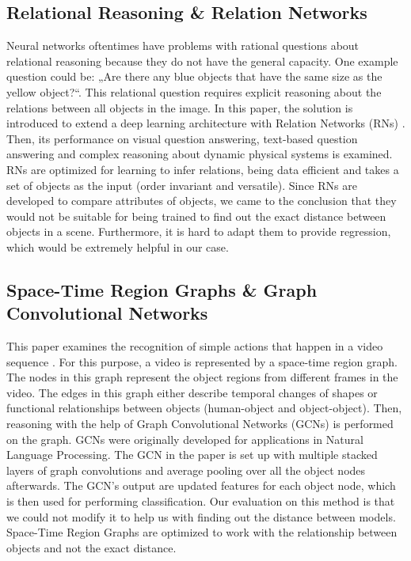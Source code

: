 \documentclass[a4paper, 11pt]{article}
\begin{document}
\begin{multicols}{2}
\subsection{Relational Reasoning \& Relation Networks}
\begin{flushleft}
Neural networks oftentimes have problems with rational questions about relational reasoning because they do not have the general capacity. One example question could be: „Are there any blue objects that have the same size as the yellow object?“. This relational question requires explicit reasoning about the relations between all objects in the image. In this paper, the solution is introduced to extend a deep learning architecture with Relation Networks (RNs) \cite{santoro2017simple}. Then, its performance on visual question answering, text-based question answering and complex reasoning about dynamic physical systems is examined. RNs are optimized for learning to infer relations, being data efficient and takes a set of objects as the input (order invariant and versatile).
Since RNs are developed to compare attributes of objects, we came to the conclusion that they would not be suitable for being trained to find out the exact distance between objects in a scene. Furthermore, it is hard to adapt them to provide regression, which would be extremely helpful in our case.
\end{flushleft}

\subsection{Space-Time Region Graphs \& Graph Convolutional Networks}
\begin{flushleft}
This paper examines the recognition of simple actions that happen in a video sequence \cite{wang2018videos}. For this purpose, a video is represented by a space-time region graph. The nodes in this graph represent the object regions from different frames in the video. The edges in this graph either describe temporal changes of shapes or functional relationships between objects (human-object and object-object). Then, reasoning with the help of Graph Convolutional Networks (GCNs) is performed on the graph. GCNs were originally developed for applications in Natural Language Processing. The GCN in the paper is set up with multiple stacked layers of graph convolutions and average pooling over all the object nodes afterwards. The GCN’s output are updated features for each object node, which is then used for performing classification.
Our evaluation on this method is that we could not modify it to help us with finding out the distance between models. Space-Time Region Graphs are optimized to work with the relationship between objects and not the exact distance.
\end{flushleft}


\end{multicols}
\end{document}
